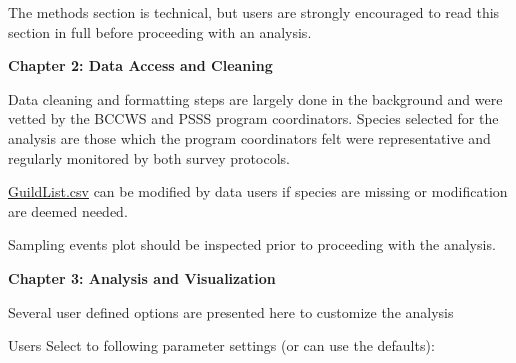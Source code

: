 \documentclass[
  letterpaper,
  DIV=11,
  numbers=noendperiod]{scrreprt}
\begin{document}
The methods section is technical, but users are strongly encouraged to
read this section in full before proceeding with an analysis.

\textbf{Chapter 2: Data Access and Cleaning}

Data cleaning and formatting steps are largely done in the background
and were vetted by the BCCWS and PSSS program coordinators. Species
selected for the analysis are those which the program coordinators felt
were representative and regularly monitored by both survey protocols.

\href{Data/GuildList.csv}{GuildList.csv} can be modified by data users
if species are missing or modification are deemed needed.

Sampling events plot should be inspected prior to proceeding with the
analysis.

\textbf{Chapter 3: Analysis and Visualization}

Several user defined options are presented here to customize the
analysis

Users Select to following parameter settings (or can use the defaults):
\end{document}
